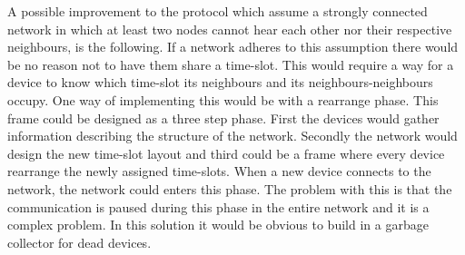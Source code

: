A possible improvement to the protocol which assume a strongly connected network in which at least two nodes cannot hear each other nor their respective neighbours, is the following.
If a network adheres to this assumption there would be no reason not to have them share a time-slot.
This would require a way for a device to know which time-slot its neighbours and its neighbours-neighbours occupy.
One way of implementing this would be with a rearrange phase.
This frame could be designed as a three step phase. 
First the devices would gather information describing the structure of the network.
Secondly the network would design the new time-slot layout and third could be a frame where every device rearrange the newly assigned time-slots.
When a new device connects to the network, the network could enters this phase.
The problem with this is that the communication is paused during this phase in the entire network and it is a complex problem.
In this solution it would be obvious to build in a garbage collector for dead devices.


